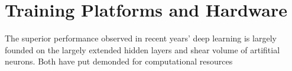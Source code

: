 \section{Training Platforms and Hardware}
The superior performance observed in recent years' deep learning is largely founded on the largely extended hidden layers and shear volume of artifitial neurons. Both have put demonded for computational resources 